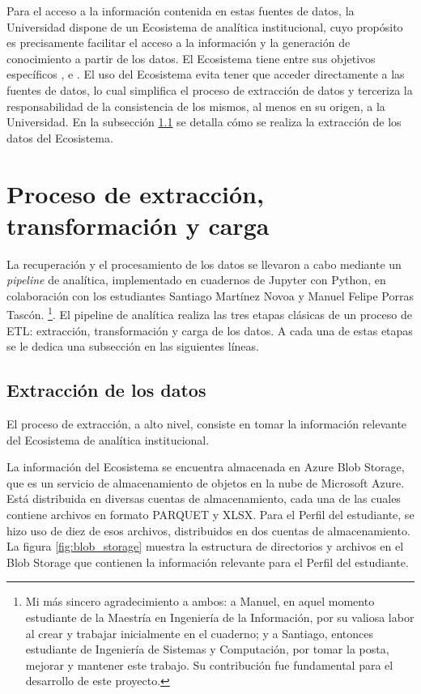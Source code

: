 Para el acceso a la información contenida en estas fuentes de datos, la Universidad dispone de un Ecosistema de analítica institucional, cuyo propósito es precisamente facilitar el acceso a la información y la generación de conocimiento a partir de los datos. El Ecosistema tiene entre sus objetivos específicos ,  e  \cite{ecosistema}. El uso del Ecosistema evita tener que acceder directamente a las fuentes de datos, lo cual simplifica el proceso de extracción de datos y terceriza la responsabilidad de la consistencia de los mismos, al menos en su origen, a la Universidad. En la subsección \ref{subsec:extraccion} se detalla cómo se realiza la extracción de los datos del Ecosistema.

\section{Proceso de extracción, transformación y carga}

La recuperación y el procesamiento de los datos se llevaron a cabo mediante un \textit{\gls{pipeline}} de analítica, implementado en cuadernos de \gls{Jupyter} con \gls{Python}, en colaboración con los estudiantes Santiago Martínez Novoa y Manuel Felipe Porras Tascón.
\footnote{Mi más sincero agradecimiento a ambos: a Manuel, en aquel momento estudiante de la Maestría en Ingeniería de la Información, por su valiosa labor al crear y trabajar inicialmente en el cuaderno; y a Santiago, entonces estudiante de Ingeniería de Sistemas y Computación, por tomar la posta, mejorar y mantener este trabajo. Su contribución fue fundamental para el desarrollo de este proyecto.}.
El pipeline de analítica realiza las tres etapas clásicas de un proceso de \gls{ETL}: extracción, transformación y carga de los datos. A cada una de estas etapas se le dedica una subsección en las siguientes líneas.


\subsection{Extracción de los datos}
\label{subsec:extraccion}

El proceso de extracción, a alto nivel, consiste en tomar la información relevante del Ecosistema de analítica institucional.

La información del Ecosistema se encuentra almacenada en \gls{Azure Blob Storage}, que es un servicio de almacenamiento de objetos en la nube de Microsoft Azure. Está distribuida en diversas cuentas de almacenamiento, cada una de las cuales contiene archivos en formato PARQUET y XLSX. Para el Perfil del estudiante, se hizo uso de diez de esos archivos, distribuidos en dos cuentas de almacenamiento. La figura \ref{fig:blob_storage} muestra la estructura de directorios y archivos en el Blob Storage que contienen la información relevante para el Perfil del estudiante.

